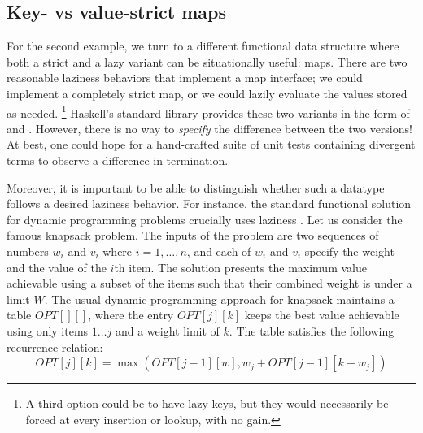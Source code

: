 \documentclass[acmsmall,review]{acmart}\settopmatter{}
\begin{document}
\subsection{Key- vs value-strict maps}


For the second example, we turn to a different functional data structure where
both a strict and a lazy variant can be situationally useful: maps. There are
two reasonable laziness behaviors that implement a map interface; we could
implement a completely strict map, or we could lazily evaluate the values stored
as needed.
\footnote{A third option could be to have lazy keys, but they would
necessarily be forced at every insertion or lookup, with no gain.}
Haskell's standard library provides these two variants in the form of
 and . However, there is no way
to {\em specify} the difference between the two versions! At best, one
could hope for a hand-crafted suite of unit tests containing divergent
terms to observe a difference in termination.


Moreover, it is important to be able to distinguish whether such a
datatype follows a desired laziness behavior.  For instance, the
standard functional solution for dynamic programming problems
crucially uses laziness . Let us consider the famous knapsack problem.
%
The inputs of the problem are two sequences of numbers $w_i$ and $v_i$
where $i = 1, \dots, n$, and each of $w_i$ and $v_i$ specify the
weight and the value of the $i$th item. The solution presents the
maximum value achievable using a subset of the items such that their
combined weight is under a limit $W$.
%
The usual dynamic programming approach for knapsack maintains a
table $OPT[][]$, where the entry $OPT[j][k]$ keeps the best value
achievable using only items $1\dots j$ and a weight limit of $k$. The
table satisfies the following recurrence relation: $$OPT[j][k]
= \max(OPT[j-1][w], w_j + OPT[j-1][k-w_j])$$
\end{document}
